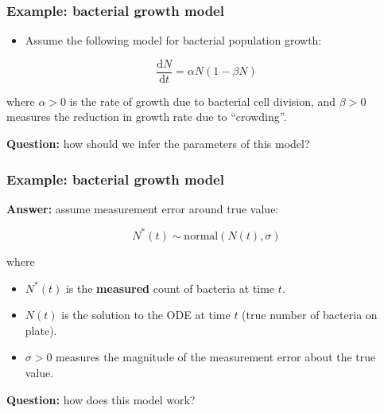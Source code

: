 \documentclass[handout]{beamer}
\begin{document}
\begin{frame}
	\frametitle{Example: bacterial growth model}
	\begin{itemize}
		\item<2-> Assume the following model for bacterial population growth:
	\end{itemize}
	
	\begin{equation}
	\frac{\mathrm{d}N}{\mathrm{d}t} = \alpha N (1-\beta N)
	\end{equation}
	
	where $\alpha>0$ is the rate of growth due to bacterial cell division, and $\beta>0$ measures the reduction in growth rate due to ``crowding''. 
	
	\textbf{Question:} how should we infer the parameters of this model?
	
\end{frame}

\begin{frame}
	\frametitle{Example: bacterial growth model}
	\textbf{Answer:} assume measurement error around true value:
	
	\begin{equation}
	N^*(t) \sim \text{normal}(N(t), \sigma)
	\end{equation}
	
	where
	\begin{itemize}
		\item<5-> $N^*(t)$ is the \textbf{measured} count of bacteria at time $t$.
		\item<6-> $N(t)$ is the solution to the ODE at time $t$ (true number of bacteria on plate).
		\item<7-> $\sigma>0$ measures the magnitude of the measurement error about the true value.
	\end{itemize}
	
	 \textbf{Question:} how does this model work?
	
\end{frame}
\end{document}
